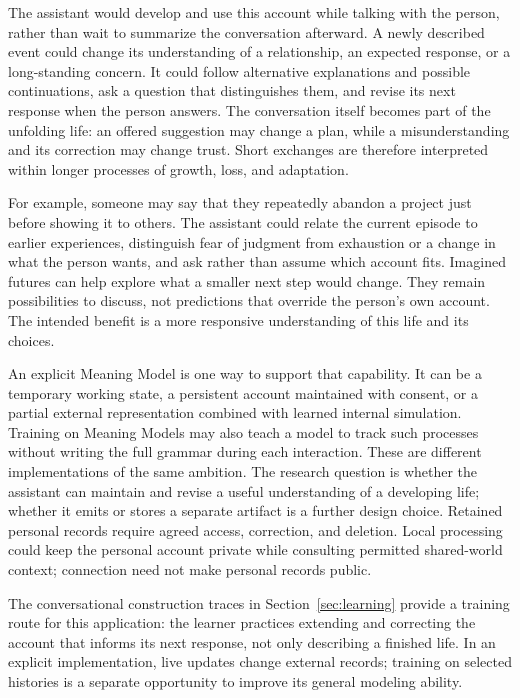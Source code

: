 \documentclass[10pt]{article}
\begin{document}
The assistant would develop and use this account while talking with the
person, rather than wait to summarize the conversation afterward. A newly
described event could change its understanding of a relationship, an expected
response, or a long-standing concern. It could follow alternative explanations
and possible continuations, ask a question that distinguishes them, and revise
its next response when the person answers. The conversation itself becomes
part of the unfolding life: an offered suggestion may change a plan, while a
misunderstanding and its correction may change trust. Short exchanges are
therefore interpreted within longer processes of growth, loss, and adaptation.

For example, someone may say that they repeatedly abandon a project just
before showing it to others. The assistant could relate the current episode
to earlier experiences, distinguish fear of judgment from exhaustion or a
change in what the person wants, and ask rather than assume which account
fits. Imagined futures can help explore what a smaller next step would change.
They remain possibilities to discuss, not predictions that override the
person's own account. The intended benefit is a more responsive understanding
of this life and its choices.

An explicit Meaning Model is one way to support that capability. It can be a
temporary working state, a persistent account maintained with consent, or a
partial external representation combined with learned internal simulation.
Training on Meaning Models may also teach a model to track such processes
without writing the full grammar during each interaction. These are different
implementations of the same ambition. The research question is whether the
assistant can maintain and revise a useful understanding of a developing life;
whether it emits or stores a separate artifact is a further design choice.
Retained personal records require agreed access, correction, and deletion.
Local processing could keep the personal account private while consulting
permitted shared-world context; connection need not make personal records public.

The conversational construction traces in Section~\ref{sec:learning} provide
a training route for this application: the learner practices extending and
correcting the account that informs its next response, not only describing a
finished life. In an explicit implementation, live updates change external
records; training on selected histories is a separate opportunity to improve
its general modeling ability.
\end{document}
